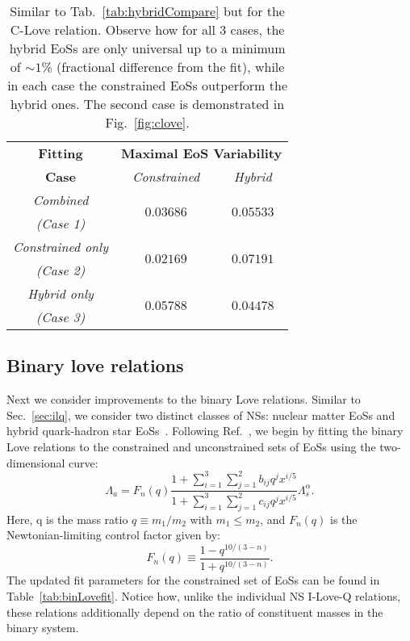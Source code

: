 \documentclass[prd,twocolumn,nofootinbib,superscriptaddress,amsmath,amssymb]{revtex4-1}
\begin{document}
\begin{table}
\centering
\caption{
Similar to Tab.~\ref{tab:hybridCompare} but for the C-Love relation.
Observe how for all 3 cases, the hybrid EoSs are only universal up to a minimum of $\sim1$\% (fractional difference from the fit), while in each case the constrained EoSs outperform the hybrid ones.
The second case is demonstrated in Fig.~\ref{fig:clove}.
}\label{tab:hybridCompareClove}
\begin{tabular}{ c  || c c } 
 \hline
 \hline
 \textbf{Fitting} & \multicolumn{2}{c}{\textbf{Maximal EoS Variability}} \\
 \cline{2-3}
 \textbf{Case} &  \multicolumn{1}{c|}{\emph{Constrained}} & \emph{Hybrid}\\
 \hline
 \emph{Combined} &  \multirow{2}{*}{$0.03686$} & \multirow{2}{*}{$0.05533$}\\
 \emph{(Case 1)} & &\\
 \cline{1-1}
 \emph{Constrained only} & \multirow{2}{*}{$0.02169$} & \multirow{2}{*}{$0.07191$}\\
  \emph{(Case 2)} & &\\
  \cline{1-1}
 \emph{Hybrid only} & \multirow{2}{*}{$0.05788$} & \multirow{2}{*}{$0.04478$}\\
  \emph{(Case 3)} & &\\
  \cline{1-1}
\hline
\hline
\end{tabular}
\end{table}


\subsection{Binary love relations}
\label{sec:binary}

Next we consider improvements to the binary Love relations.
Similar to Sec.~\ref{sec:ilq}, we consider two distinct classes of NSs: nuclear matter EoSs and hybrid quark-hadron star EoSs~\cite{Paschalidis2018,Alford:2017qgh,1971SvA....15..347S,Zdunik:2012dj,Alford:2013aca}.
Following Ref.~\cite{Yagi:binLove}, we begin by fitting the binary Love relations to the constrained and unconstrained sets of EoSs using the two-dimensional curve:
\begin{equation}\label{eq:binLovefit}
\Lambda_a=F_n(q) \frac{1+ \sum_{i=1}^3 \sum_{j=1}^2 b_{ij}q^j x^{i/5}}{1 + \sum_{i=1}^3 \sum_{j=1}^2 c_{ij}q^j x^{i/5}} \Lambda_s^{\alpha}.
\end{equation}
Here, q is the mass ratio $q \equiv m_1/m_2$ with $m_1 \leq m_2$, and $F_n(q)$ is the Newtonian-limiting control factor given by:
\begin{equation}\label{eq:control}
F_n(q) \equiv \frac{1-q^{10/(3-n)}}{1+q^{10/(3-n)}}.
\end{equation}
The updated fit parameters for the constrained set of EoSs can be found in Table~\ref{tab:binLovefit}.
Notice how, unlike the individual NS I-Love-Q relations, these relations additionally depend on the ratio of constituent masses in the binary system.
\end{document}
